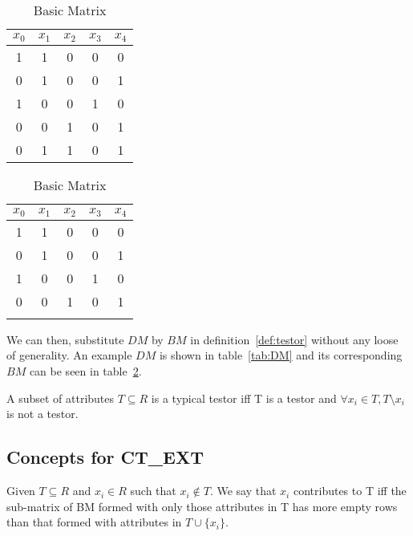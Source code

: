 \documentclass[citeauthoryear]{llncs}
\begin{document}
	\begin{table}[!htb]
    \begin{minipage}{.5\linewidth}
      \caption{Discernibility Matrix}
      \centering
        \begin{tabular}{ccccc}\label{tab:DM}
            $x_0$ & $x_1$ & $x_2$ & $x_3$ & $x_4$\\
        		\hline
        		1&1&0&0&0\\
        		0&1&0&0&1\\
        		1&0&0&1&0\\
        		0&0&1&0&1\\
        		0&1&1&0&1\\
        \end{tabular}
    \end{minipage}%
    \begin{minipage}{.5\linewidth}
      \centering
        \caption{Basic Matrix}
        \begin{tabular}{ccccc}\label{tab:BM}
            $x_0$ & $x_1$ & $x_2$ & $x_3$ & $x_4$\\
        		\hline
        		1&1&0&0&0\\
        		0&1&0&0&1\\
        		1&0&0&1&0\\
        		0&0&1&0&1\\
        		\\
        \end{tabular}
    	\end{minipage} 
	\end{table}
	
	We can then, substitute $DM$ by $BM$ in definition~\ref{def:testor} without 
	any loose of generality. An example $DM$ is shown in table~\ref{tab:DM} and
	its corresponding $BM$ can be seen in table~\ref{tab:BM}.
	
	\begin{definition}\label{def:TT}
		A subset of attributes $T \subseteq R$ is a typical testor iff T is a testor and
		$\forall x_i \in T, T \setminus x_i$ is not a testor. 
	\end{definition}	
%	
\subsection{Concepts for CT\_EXT}
%
		
	\begin{definition}\label{def:contrib}
		Given $T \subseteq R$ and $x_i \in R$ such that $x_i \notin T$. We say that $x_i$ contributes to T iff 
		the sub-matrix of BM formed with only those attributes in T has more empty rows than that formed with attributes
		in $T \cup \lbrace x_i \rbrace$.
	\end{definition}	
	
\end{document}
